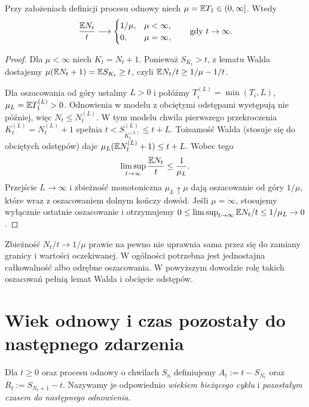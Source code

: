 \begin{twierdzenie}
Przy założeniach definicji procesu odnowy niech
$\mu=\mathbb{E} T_1\in(0,\infty]$. Wtedy
\[
\frac{\mathbb{E} N_t}{t}\longrightarrow
\begin{cases}1/\mu,&\mu<\infty,\\0,&\mu=\infty,\end{cases}
\qquad\text{gdy }t\to\infty.
\]
\end{twierdzenie}
\begin{proof}
Dla $\mu<\infty$ niech $K_t=N_t+1$.
Ponieważ $S_{K_t}>t$, z lematu Walda dostajemy
$\mu(\mathbb{E} N_t+1)=\mathbb{E} S_{K_t}\ge t$,
czyli $\mathbb{E} N_t/t\ge1/\mu-1/t$.

Dla oszacowania od góry ustalmy $L>0$ i połóżmy
$T_i^{(L)}=\min(T_i,L)$, $\mu_L=\mathbb{E} T_1^{(L)}>0$.
Odnowienia w modelu z obciętymi odstępami występują
nie później, więc $N_t\le N_t^{(L)}$.
W tym modelu chwila pierwszego przekroczenia
$K_t^{(L)}=N_t^{(L)}+1$ spełnia
$t<S_{K_t^{(L)}}^{(L)}\le t+L$.
Tożsamość Walda (stosuje się do obciętych odstępów) daje
$\mu_L(\mathbb{E} N_t^{(L)}+1)\le t+L$. Wobec tego
\[
\limsup_{t\to\infty}\frac{\mathbb{E} N_t}{t}\le\frac{1}{\mu_L}.
\]
Przejście $L\to\infty$ i zbieżność monotoniczna
$\mu_L\uparrow\mu$ dają oszacowanie od góry $1/\mu$,
które wraz z oszacowaniem dolnym kończy dowód.
Jeśli $\mu=\infty$, stosujemy wyłącznie ostatnie
oszacowanie i otrzymujemy
$0\le\limsup_{t\to\infty}\mathbb{E} N_t/t\le1/\mu_L\to0$.
\end{proof}

\begin{uwaga}
Zbieżność $N_t/t\to1/\mu$ prawie na pewno nie uprawnia
sama przez się do zamiany granicy i wartości oczekiwanej.
W ogólności potrzebna jest jednostajna całkowalność
albo odrębne oszacowania. W powyższym dowodzie rolę takich
oszacowań pełnią lemat Walda i obcięcie odstępów.
\end{uwaga}

\section{Wiek odnowy i czas pozostały do następnego zdarzenia}
\begin{definicja}
Dla $t\ge0$ oraz procesu odnowy o chwilach $S_n$ definiujemy
$A_t:=t-S_{N_t}$ oraz $R_t:=S_{N_t+1}-t$.
Nazywamy je odpowiednio \emph{wiekiem bieżącego cyklu}
i \emph{pozostałym czasem do następnego odnowienia}.
\end{definicja}

